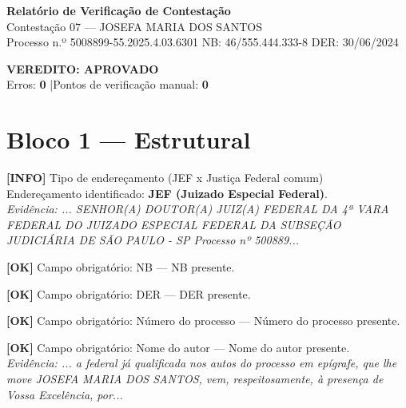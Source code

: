 \documentclass[12pt,a4paper]{article}
\newcommand{\statusOK}[1]{\textcolor{corOK}{\textbf{[OK]}} #1}
\newcommand{\statusINFO}[1]{\textcolor{corINFO}{\textbf{[INFO]}} #1}
\begin{document}
\begin{center}
  {\LARGE \textbf{Relatório de Verificação de Contestação}}\\[0.4em]
  {\large Contestação 07 --- JOSEFA MARIA DOS SANTOS}\\[0.2em]
  {\small Processo n.º 5008899-55.2025.4.03.6301 \quad NB: 46/555.444.333-8 \quad DER: 30/06/2024}
\end{center}

\vspace{0.5em}

\noindent\colorbox{corFundoAprovado}{%
  \begin{minipage}{\dimexpr\linewidth-2\fboxsep}
    \centering
    \vspace{0.3em}
    {\large \textcolor{corOK}{\textbf{VEREDITO: APROVADO}}}\\
    Erros: \textbf{0} \quad|\quad Pontos de verificação manual: \textbf{0}
    \vspace{0.3em}
  \end{minipage}%
}

\vspace{1em}


\section{Bloco 1 --- Estrutural}

\statusINFO{Tipo de endereçamento (JEF x Justiça Federal comum)}\\
Endereçamento identificado: \textbf{JEF (Juizado Especial Federal)}.\\
\textit{Evidência: ... SENHOR(A) DOUTOR(A) JUIZ(A) FEDERAL DA 4ª VARA FEDERAL DO JUIZADO ESPECIAL FEDERAL DA SUBSEÇÃO JUDICIÁRIA DE SÃO PAULO - SP Processo nº 500889...}

\medskip
\statusOK{Campo obrigatório: NB} --- NB presente.

\medskip
\statusOK{Campo obrigatório: DER} --- DER presente.

\medskip
\statusOK{Campo obrigatório: Número do processo} --- Número do processo presente.

\medskip
\statusOK{Campo obrigatório: Nome do autor} --- Nome do autor presente.\\
\textit{Evidência: ... a federal já qualificada nos autos do processo em epígrafe, que lhe move JOSEFA MARIA DOS SANTOS, vem, respeitosamente, à presença de Vossa Excelência, por...}
\end{document}
